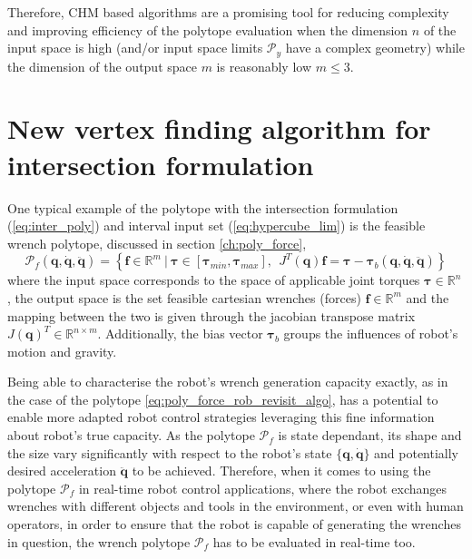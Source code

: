 Therefore, CHM based algorithms are a promising tool for reducing complexity and improving efficiency of the polytope evaluation when the dimension $n$ of the input space is high (and/or input space limits $\mathcal{P}_y$ have a complex geometry) while the dimension of the output space $m$ is reasonably low $m\leq3$.

\section{New vertex finding algorithm for intersection formulation}
\label{sec:algorithm_vea}

One typical example of the polytope with the intersection formulation (\ref{eq:inter_poly}) and interval input set (\ref{eq:hypercube_lim}) is the feasible wrench polytope, discussed in section \ref{ch:poly_force},
\begin{equation}
    \mathcal{P}_f(\bm{q},\dot{\bm{q}},\ddot{\bm{q}}) = \left\{ \bm{f} \in \mathbb{R}^m ~|~ \bm{\tau}\in\left[\bm{\tau}_{min}, \bm{\tau}_{max} \right], ~~ J^T(\bm{q})\bm{f} = \bm{\tau} -\bm{\tau}_b(\bm{q},\dot{\bm{q}},\ddot{\bm{q}}) \right\}
    \label{eq:poly_force_rob_revisit_algo}
\end{equation}
where the input space corresponds to the space of applicable joint torques $\bm{\tau}\in\mathbb{R}^n$, the output space is the set feasible cartesian wrenches (forces) $\bm{f}\in\mathbb{R}^m$ and the mapping between the two is given through the jacobian transpose matrix $J(\bm{q})^T\in\mathbb{R}^{n\times m}$. Additionally, the bias vector $\bm{\tau}_b$ groups the influences of robot's motion and gravity.

Being able to characterise the robot's wrench generation capacity exactly, as in the case of the polytope \ref{eq:poly_force_rob_revisit_algo}, has a potential to enable more adapted robot control strategies leveraging this fine information about robot's true capacity.  As the polytope $\mathcal{P}_f$ is state dependant, its shape and the size vary significantly with respect to the robot's state $\{\bm{q},\dot{\bm{q}}\}$ and potentially desired acceleration $\ddot{\bm{q}}$ to be achieved. Therefore, when it comes to using the polytope $\mathcal{P}_f$ in real-time robot control applications, where the robot exchanges wrenches with different objects and tools in the environment, or even with human operators, in order to ensure that the robot is capable of generating the wrenches in question, the wrench polytope $\mathcal{P}_f$ has to be evaluated in real-time too. 

